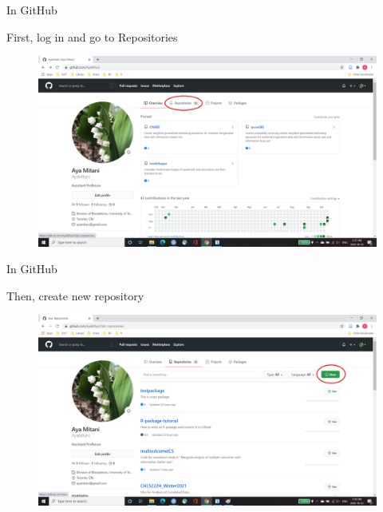 \documentclass[
  ignorenonframetext,
]{beamer}
\begin{document}
\begin{frame}{In GitHub}
\protect\hypertarget{in-github}{}

First, log in and go to Repositories

\begin{figure}
  \includegraphics[scale=0.275]{slides_files/figure-beamer/GitHub_step1.png}
\end{figure}

\end{frame}

\begin{frame}{In GitHub}
\protect\hypertarget{in-github-1}{}

Then, create new repository

\begin{figure}
  \includegraphics[scale=0.275]{slides_files/figure-beamer/GitHub_step2.png}
\end{figure}

\end{frame}
\end{document}
